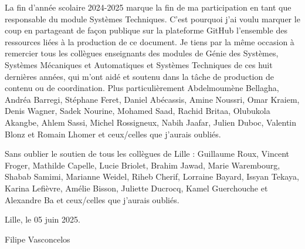 La fin d'année scolaire 2024-2025 marque la fin de ma
participation en tant que responsable du module \og Systèmes Techniques\fg. C'est pourquoi
j'ai voulu marquer le coup en partageant de façon publique sur la plateforme GitHub
l'ensemble des ressources liées à la production de ce document.
Je tiens par la même occasion à remercier tous les collègues enseignants des modules
de \og Génie des Systèmes\fg, \og Systèmes Mécaniques et Automatiques\fg
et \og Systèmes Techniques\fg
de ces huit dernières années, qui m'ont aidé et soutenu dans la tâche de production
de contenu ou de coordination. Plus particulièrement
Abdelmoumène Bellagha, Andréa Barregi, Stéphane Feret, Daniel Abécassis,
Amine Noussri, Omar Kraiem, Denis Wagner, Sadek Nourine, Mohamed Saad,
Rachid Britaa, Olubukola Akangbe, Ahlem Sassi, Michel Rossigneux,
Nabih Jaafar, Julien Duboc, Valentin Blonz et Romain Lhomer
et ceux/celles que j'aurais oubliés.

Sans oublier le soutien de tous les collègues de Lille :
Guillaume Roux, Vincent Froger, Mathilde Capelle, Lucie Briolet,
Brahim Jawad, Marie Warembourg, Shabab Samimi, Marianne Weidel,
Riheb Cherif, Lorraine Bayard, Issyan Tekaya, Karina Lefièvre, Amélie Bisson,
Juliette Ducrocq, Kamel Guerchouche et Alexandre Ba et ceux/celles que j'aurais oubliés.

\hspace{1cm}
\hfill Lille, le 05 juin 2025.

\hfill Filipe Vasconcelos
